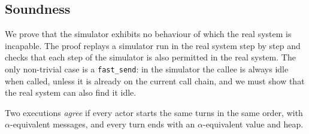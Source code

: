 \documentclass[11pt]{article}
\theoremstyle{definition}
\theoremstyle{remark}
\newcommand{\fs}{\texttt{fast\_send}}
\begin{document}
\subsection{Soundness}
\label{sec:gq-sound}

We prove that the simulator exhibits no behaviour of which the real system is incapable.
The proof replays a simulator run in the real system step by step and checks that each
step of the simulator is also permitted in the real system. The only non-trivial case is
a \fs{}: in the simulator the callee is always idle when called, unless it is already on
the current call chain, and we must show that the real system can also find it idle.

Two executions \emph{agree} if every actor starts the same turns in the same order, with
$\alpha$-equivalent messages, and every turn ends with an $\alpha$-equivalent value and
heap.
\end{document}
